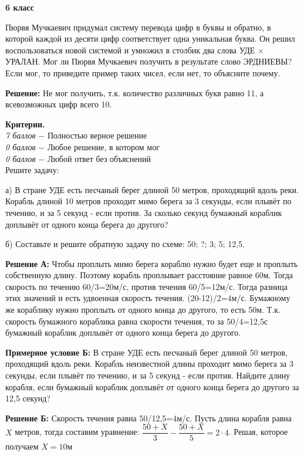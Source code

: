 \centerline{\bf \Large  6 класс}

 Пюрвя Мучкаевич придумал систему перевода цифр в буквы и обратно, в которой каждой из десяти цифр соответствует одна уникальная буква. Он решил воспользоваться новой системой и умножил в столбик два слова УДЕ $\times$ УРАЛАН. Мог ли Пюрвя Мучкаевич получить в результате слово ЭРДНИЕВЫ? Если мог, то приведите пример таких чисел, если нет, то объясните почему.

\textbf{Решение:} Не мог получить, т.к. количество различных букв равно 11, а всевозможных цифр всего 10.

\textbf{Критерии.} \\
\textit{7 баллов} $-$ Полностью верное решение\\
\textit{0 баллов} $-$ Любое решение, в котором мог\\
\textit{0 баллов} $-$ Любой ответ без объяснений\\

 Решите задачу:

а) В стране УДЕ есть песчаный берег длиной 50 метров, проходящий вдоль реки. Корабль длиной 10 метров проходит мимо берега за 3 секунды, если плывёт по течению, и за 5 секунд - если против. За сколько секунд бумажный кораблик доплывёт от одного конца берега до другого?

б) Составьте и решите обратную задачу по схеме: 50; ?; 3; 5; 12,5.

\textbf{Решение А:} Чтобы проплыть мимо берега кораблю нужно будет еще и проплыть собственную длину. Поэтому корабль проплывает расстояние равное 60м. Тогда скорость по течению 60/3=20м/с, против течения 60/5=12м/с. Тогда разница этих значений и есть удвоенная скорость течения. (20-12)/2=4м/с. Бумажному же кораблику нужно проплыть от одного конца до другого, то есть 50м. Т.к. скорость бумажного кораблика равна скорости течения, то за 50/4=12,5с бумажный кораблик доплывёт от одного конца берега до другого.

\textbf{Примерное условие Б:} В стране УДЕ есть песчаный берег длиной 50 метров, проходящий вдоль реки. Корабль неизвестной длины проходит мимо берега за 3 секунды, если плывёт по течению, и за 5 секунд - если против. Найдите длину корабля, если бумажный кораблик доплывёт от одного конца берега до другого за 12,5 секунд?

\textbf{Решение Б:} Скорость течения равна 50/12,5=4м/с. Пусть длина корабля равна $X$ метров, тогда составим уравнение: $\dfrac{50+X}{3}-\dfrac{50+X}{5}=2\cdot4$. Решая, которое получаем $X=10м$

